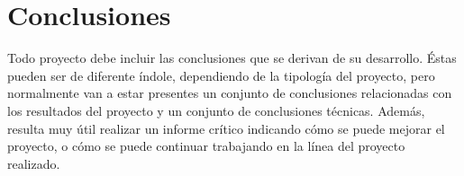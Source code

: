 
\section{Conclusiones}
Todo proyecto debe incluir las conclusiones que se derivan de su desarrollo. Éstas pueden ser de diferente índole, dependiendo de la tipología del proyecto, pero normalmente van a estar presentes un conjunto de conclusiones relacionadas con los resultados del proyecto y un conjunto de conclusiones técnicas. 
Además, resulta muy útil realizar un informe crítico indicando cómo se puede mejorar el proyecto, o cómo se puede continuar trabajando en la línea del proyecto realizado. 
